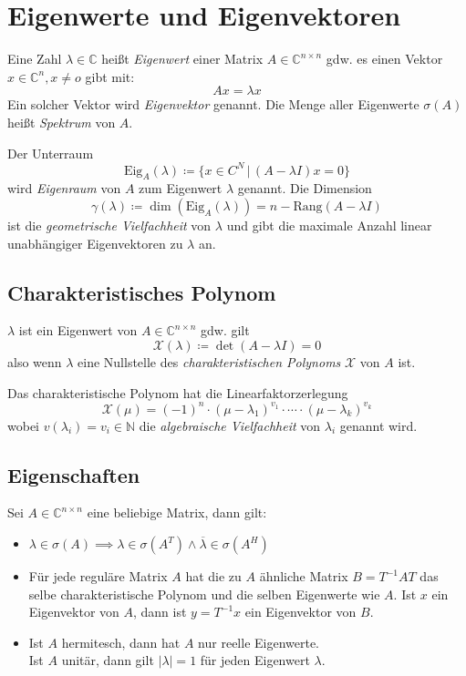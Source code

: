 \documentclass[a4paper, 11pt, accentcolor = tud3b]{tudreport}
\newcommand{\forwhich}{\ensuremath{{\,\vert\,}}}
\newcommand{\abs}[1]{\ensuremath{{\lvert #1 \rvert}}}
\newcommand{\C}{\ensuremath{\mathbb{C}}}
\newcommand{\N}{\ensuremath{\mathbb{N}}}
\newcommand{\Eig}{\ensuremath{\textrm{Eig}}}
\newcommand{\Rang}{\ensuremath{\textrm{Rang}}}
\begin{document}
	    \section{Eigenwerte und Eigenvektoren}
	        Eine Zahl \( \lambda \in \C \) heißt \textit{Eigenwert} einer Matrix \( A \in \C^{n \times n} \) gdw. es einen Vektor \( x \in \C^n, x \neq o \) gibt mit:
	        \begin{equation*}
		        Ax = \lambda x
	        \end{equation*}
	        Ein solcher Vektor wird \textit{Eigenvektor} genannt. Die Menge aller Eigenwerte \( \sigma(A) \) heißt \textit{Spektrum} von \(A\).
	        
	        Der Unterraum \[ \Eig_A(\lambda) \coloneqq \{ x \in C^N \forwhich (A - \lambda I)x = 0 \} \] wird \textit{Eigenraum} von \(A\) zum Eigenwert \(\lambda\) genannt. Die Dimension \[ \gamma(\lambda) \coloneqq \dim(\Eig_A(\lambda)) = n - \Rang(A - \lambda I) \] ist die \textit{geometrische Vielfachheit} von \(\lambda\) und gibt die maximale Anzahl linear unabhängiger Eigenvektoren zu \(\lambda\) an.
	
	        \subsection{Charakteristisches Polynom}
	            \( \lambda \) ist ein Eigenwert von \(A \in \C^{n \times n} \) gdw. gilt \[ \mathcal{X}(\lambda) \coloneqq \det (A - \lambda I) = 0 \] also wenn \(\lambda\) eine Nullstelle des \textit{charakteristischen Polynoms} \(\mathcal{X}\) von \(A\) ist.
	            
	            Das charakteristische Polynom hat die Linearfaktorzerlegung \[ \mathcal{X}(\mu) = (-1)^n \cdot (\mu - \lambda_1)^{v_1} \cdot \cdots \cdot (\mu - \lambda_k)^{v_k} \] wobei \( v(\lambda_i) = v_i \in \N \) die \textit{algebraische Vielfachheit} von \(\lambda_i\) genannt wird.
	
	        \subsection{Eigenschaften}
	            Sei \( A \in \C^{n \times n} \) eine beliebige Matrix, dann gilt:
	            \begin{itemize}
	            	\item \( \lambda \in \sigma(A) \implies \lambda \in \sigma(A^T) \land \overline{\lambda} \in \sigma(A^H) \)
	            	\item Für jede reguläre Matrix \(A\) hat die zu \(A\) ähnliche Matrix \( B = T^{-1} A T \) das selbe charakteristische Polynom und die selben Eigenwerte wie \(A\). Ist \(x\) ein Eigenvektor von \(A\), dann ist \( y = T^{-1} x \) ein Eigenvektor von \(B\).
	            	\item Ist \(A\) hermitesch, dann hat \(A\) nur reelle Eigenwerte. \\ Ist \(A\) unitär, dann gilt \( \abs{\lambda} = 1 \) für jeden Eigenwert \(\lambda\).
	            \end{itemize}
	
\end{document}
